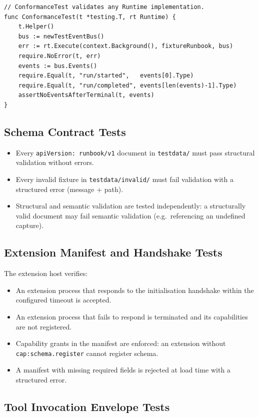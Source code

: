 \begin{verbatim}
// ConformanceTest validates any Runtime implementation.
func ConformanceTest(t *testing.T, rt Runtime) {
    t.Helper()
    bus := newTestEventBus()
    err := rt.Execute(context.Background(), fixtureRunbook, bus)
    require.NoError(t, err)
    events := bus.Events()
    require.Equal(t, "run/started",   events[0].Type)
    require.Equal(t, "run/completed", events[len(events)-1].Type)
    assertNoEventsAfterTerminal(t, events)
}
\end{verbatim}

\subsection{Schema Contract Tests}

\begin{itemize}
  \item Every \texttt{apiVersion: runbook/v1} document in \texttt{testdata/} must pass structural validation without errors.
  \item Every invalid fixture in \texttt{testdata/invalid/} must fail validation with a structured error (message + path).
  \item Structural and semantic validation are tested independently: a structurally valid document may fail semantic validation (e.g.\ referencing an undefined capture).
\end{itemize}

\subsection{Extension Manifest and Handshake Tests}

The extension host verifies:

\begin{itemize}
  \item An extension process that responds to the initialisation handshake within the configured timeout is accepted.
  \item An extension process that fails to respond is terminated and its capabilities are not registered.
  \item Capability grants in the manifest are enforced: an extension without \texttt{cap:schema.register} cannot register schema.
  \item A manifest with missing required fields is rejected at load time with a structured error.
\end{itemize}

\subsection{Tool Invocation Envelope Tests}

